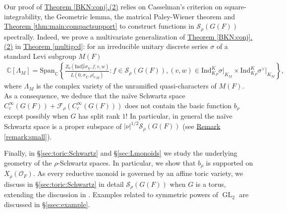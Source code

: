 \documentclass[10pt]{amsart}
\theoremstyle{definition}
\numberwithin{equation}{section}
\DeclareMathOperator{\GL}{\mathrm{GL}}
\numberwithin{equation}{subsection}
\newcommand{\Ind}{\mathrm{Ind}}
\newcommand{\CC}{\mathbb{C}}
\begin{document}
Our proof of \hyperref[BKN:conj]{Theorem \ref{BKN:conj}.(2)} relies on Casselman's criterion on square-integrability, the Geometric lemma, the matrical Paley-Wiener theorem and \hyperref[thm:main:compactsupport]{Theorem \ref{thm:main:compactsupport}} to construct functions in $\mathcal{S}_\rho(G(F))$ spectrally. Indeed, we prove a multivariate generalization of \hyperref[BKN:conj]{Theorem \ref{BKN:conj}.(2)} in \hyperref[multigcd]{Theorem \ref{multigcd}}: for an irreducible unitary discrete series $\sigma$ of a standard Levi subgroup $M(F)$
\begin{align*}
    \CC[\Lambda_M]=\mathrm{Span}_\CC\left\{\frac{Z_0(\mathrm{Ind}_P^G \sigma_\chi,f,v,w)}{L(0,\sigma_\chi,\rho|_{{}^LM})}: f\in \mathcal{S}_\rho(G(F)),(v,w)\in \Ind_{K_P}^K\sigma\vert_{K_M}\times \Ind_{K_P}^K\sigma^\vee\vert_{K_M}\right\},
\end{align*}
where $\Lambda_M$ is the complex variety of the unramified quasi-characters of $M(F)$. As a consequence, we deduce that the na\"ive Schwartz space $C^\infty_c(G(F))+\mathcal{F}_\rho(C^\infty_c(G(F)))$ does not contain the basic function $b_\rho$ except possibly when $G$ has split rank $1$! In particular, in general the na\"ive Schwartz space is a proper subspace of $|\nu|^{1/2}\mathcal{S}_\rho(G(F))$ (see \hyperref[remark:small]{Remark \ref{remark:small}}).

Finally, in \S\ref{sec:toric:Schwartz} and \S\ref{sec:Lmonoids} we study the underlying geometry of the $\rho$-Schwartz spaces. In particular, we show that $b_\rho$ is supported on $X_\rho(\mathcal{O}_F)$. As every reductive monoid is governed by an affine toric variety, we discuss in \S\ref{sec:toric:Schwartz}  in detail $\mathcal{S}_\rho(G(F))$ when $G$ is a torus, extending the discussion in \cite[\S 2.2]{Luo:Ngo}. Examples related to symmetric powers of $\GL_2$ are discussed in \S\ref{ssec:example}.
\end{document}
